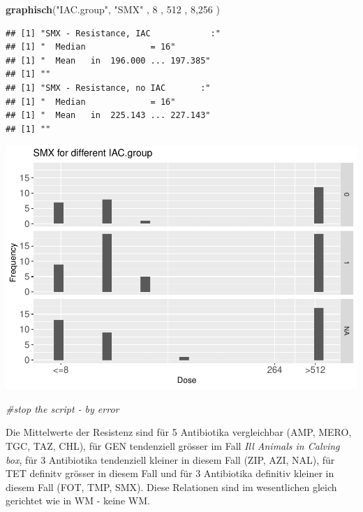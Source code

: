\documentclass[
]{article}
\newenvironment{Shaded}{\begin{snugshade}}{\end{snugshade}}
\newcommand{\CommentTok}[1]{\textcolor[rgb]{0.56,0.35,0.01}{\textit{#1}}}
\newcommand{\DecValTok}[1]{\textcolor[rgb]{0.00,0.00,0.81}{#1}}
\newcommand{\KeywordTok}[1]{\textcolor[rgb]{0.13,0.29,0.53}{\textbf{#1}}}
\newcommand{\NormalTok}[1]{#1}
\newcommand{\StringTok}[1]{\textcolor[rgb]{0.31,0.60,0.02}{#1}}
\begin{document}
\begin{Shaded}
\begin{Highlighting}[]
   \KeywordTok{graphisch}\NormalTok{(}\StringTok{"IAC.group"}\NormalTok{, }\StringTok{"SMX"}\NormalTok{ , }\DecValTok{8}\NormalTok{    , }\DecValTok{512}\NormalTok{   ,   }\DecValTok{8}\NormalTok{,}\DecValTok{256}\NormalTok{    ) }
\end{Highlighting}
\end{Shaded}

\begin{verbatim}
## [1] "SMX - Resistance, IAC            :"
## [1] "  Median             = 16"
## [1] "  Mean   in  196.000 ... 197.385"
## [1] ""
## [1] "SMX - Resistance, no IAC       :"
## [1] "  Median             = 16"
## [1] "  Mean   in  225.143 ... 227.143"
## [1] ""
\end{verbatim}

\includegraphics{Verteilungen_files/figure-latex/unnamed-chunk-17-1.pdf}

\begin{Shaded}
\begin{Highlighting}[]
   \CommentTok{#stop the script - by error }
\end{Highlighting}
\end{Shaded}

Die Mittelwerte der Resistenz sind für 5 Antibiotika vergleichbar (AMP,
MERO, TGC, TAZ, CHL), für GEN tendenziell grösser im Fall \emph{Ill
Animals in Calving box}, für 3 Antibiotika tendenziell kleiner in diesem
Fall (ZIP, AZI, NAL), für TET definitv grösser in diesem Fall und für 3
Antibiotika definitiv kleiner in diesem Fall (FOT, TMP, SMX). Diese
Relationen sind im wesentlichen gleich gerichtet wie in WM - keine WM.
\end{document}
